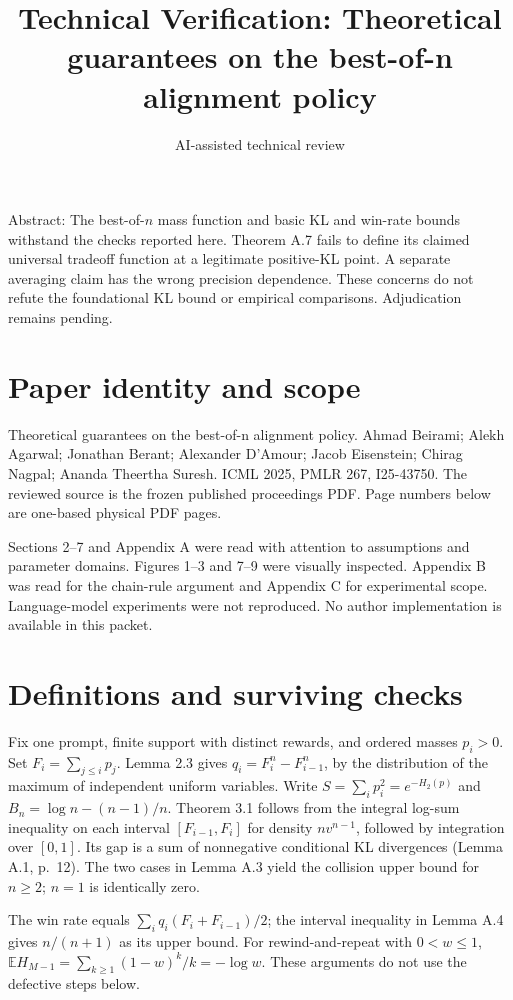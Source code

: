 \documentclass[10pt]{article}
\title{Technical Verification: Theoretical guarantees on the best-of-n alignment policy}
\author{AI-assisted technical review}
\date{}
\begin{document}
\maketitle
Abstract: The best-of-\(n\) mass function and basic KL and win-rate bounds withstand the checks reported here. Theorem A.7 fails to define its claimed universal tradeoff function at a legitimate positive-KL point. A separate averaging claim has the wrong precision dependence. These concerns do not refute the foundational KL bound or empirical comparisons. Adjudication remains pending.\par
\section*{Paper identity and scope}
Theoretical guarantees on the best-of-n alignment policy. Ahmad Beirami; Alekh Agarwal; Jonathan Berant; Alexander D’Amour; Jacob Eisenstein; Chirag Nagpal; Ananda Theertha Suresh. ICML 2025, PMLR 267, I25-43750. The reviewed source is the frozen published proceedings PDF. Page numbers below are one-based physical PDF pages.\par
Sections 2–7 and Appendix A were read with attention to assumptions and parameter domains. Figures 1–3 and 7–9 were visually inspected. Appendix B was read for the chain-rule argument and Appendix C for experimental scope. Language-model experiments were not reproduced. No author implementation is available in this packet.\par
\section*{Definitions and surviving checks}
Fix one prompt, finite support with distinct rewards, and ordered masses \(p_i>0\). Set \(F_i=\sum_{j\le i}p_j\). Lemma 2.3 gives \(q_i=F_i^n-F_{i-1}^n\), by the distribution of the maximum of independent uniform variables. Write \(S=\sum_i p_i^2=e^{-H_2(p)}\) and \(B_n=\log n-(n-1)/n\). Theorem 3.1 follows from the integral log-sum inequality on each interval \([F_{i-1},F_i]\) for density \(nv^{n-1}\), followed by integration over \([0,1]\). Its gap is a sum of nonnegative conditional KL divergences (Lemma A.1, p. 12). The two cases in Lemma A.3 yield the collision upper bound for \(n\ge2\); \(n=1\) is identically zero.\par
The win rate equals \(\sum_iq_i(F_i+F_{i-1})/2\); the interval inequality in Lemma A.4 gives \(n/(n+1)\) as its upper bound. For rewind-and-repeat with \(0<w\le1\), \(\mathbb E H_{M-1}=\sum_{k\ge1}(1-w)^k/k=-\log w\). These arguments do not use the defective steps below.\par
\end{document}
